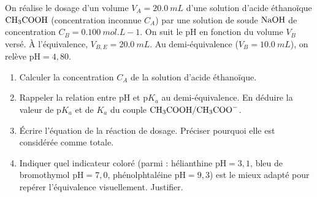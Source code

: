 \documentclass[11pt]{article}
\begin{document}
\begin{exercice}
On réalise le dosage d'un volume $V_A = \SI{20,0}{mL}$ d'une solution d'acide éthanoïque $\ce{CH3COOH}$ (concentration inconnue $C_A$) par une solution de soude $\ce{NaOH}$ de concentration $C_B = \SI{0,100}{mol.L-1}$. On suit le pH en fonction du volume $V_B$ versé. À l'équivalence, $V_{B,E} = \SI{20,0}{mL}$. Au demi-équivalence ($V_B = \SI{10,0}{mL}$), on relève $\text{pH} = 4,80$.
\begin{enumerate}
    \item Calculer la concentration $C_A$ de la solution d'acide éthanoïque.
    \item Rappeler la relation entre $\text{pH}$ et $\text{p}K_a$ au demi-équivalence. En déduire la valeur de $\text{p}K_a$ et de $K_a$ du couple $\ce{CH3COOH/CH3COO-}$.
    \item Écrire l'équation de la réaction de dosage. Préciser pourquoi elle est considérée comme totale.
    \item Indiquer quel indicateur coloré (parmi : hélianthine $\text{pH}=3,1$, bleu de bromothymol $\text{pH}=7,0$, phénolphtaléine $\text{pH}=9,3$) est le mieux adapté pour repérer l'équivalence visuellement. Justifier.
\end{enumerate}
\end{exercice}
\end{document}
